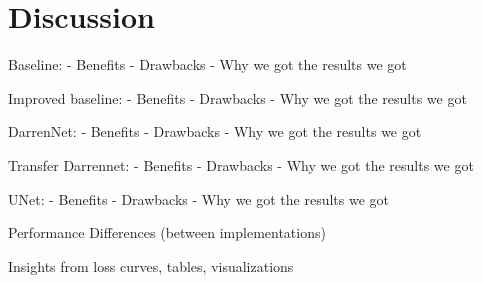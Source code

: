 \section*{Discussion}

Baseline:
- Benefits
- Drawbacks
- Why we got the results we got

Improved baseline:
- Benefits
- Drawbacks
- Why we got the results we got

DarrenNet:
- Benefits
- Drawbacks
- Why we got the results we got

Transfer Darrennet:
- Benefits
- Drawbacks
- Why we got the results we got

UNet:
- Benefits
- Drawbacks
- Why we got the results we got

Performance Differences (between implementations)

Insights from loss curves, tables, visualizations
